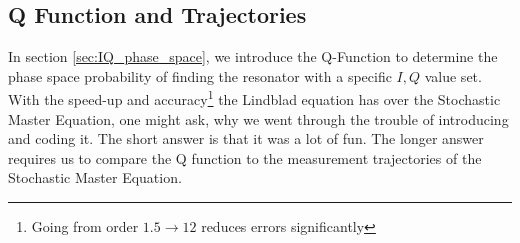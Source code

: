 
\FloatBarrier

\subsection{Q Function and Trajectories}
In section \ref{sec:IQ_phase_space}, we introduce the Q-Function to determine the phase space probability of finding the resonator with a specific $I, Q$ value set. With the speed-up and accuracy\footnote{Going from order $1.5 \rightarrow 12$ reduces errors significantly} the Lindblad equation has over the Stochastic Master Equation, one might ask, why we went through the trouble of introducing and coding it. The short answer is that it was a lot of fun. The longer answer requires us to compare the Q function to the measurement trajectories of the Stochastic Master Equation.

